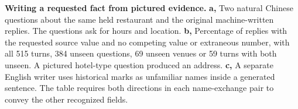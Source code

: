 \textbf{Writing a requested fact from pictured evidence.} \textbf{a,} Two natural Chinese questions about the same held restaurant and the original machine-written replies. The questions ask for hours and location. \textbf{b,} Percentage of replies with the requested source value and no competing value or extraneous number, with all 515 turns, 384 unseen questions, 69 unseen venues or 59 turns with both unseen. A pictured hotel-type question produced an address. \textbf{c,} A separate English writer uses historical marks as unfamiliar names inside a generated sentence. The table requires both directions in each name-exchange pair to convey the other recognized fields.
